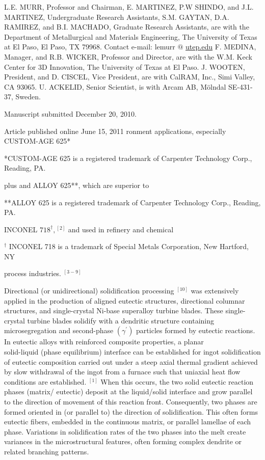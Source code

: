 \documentclass[10pt]{article}
\begin{document}
L.E. MURR, Professor and Chairman, E. MARTINEZ, P.W SHINDO, and J.L. MARTINEZ, Undergraduate Research Assistants, S.M. GAYTAN, D.A. RAMIREZ, and B.I. MACHADO, Graduate Research Assistants, are with the Department of Metallurgical and Materials Engineering, The University of Texas at El Paso, El Paso, TX 79968. Contact e-mail: lemurr $@$ \href{http://utep.edu}{utep.edu} F. MEDINA, Manager, and R.B. WICKER, Professor and Director, are with the W.M. Keck Center for 3D Innovation, The University of Texas at El Paso. J. WOOTEN, President, and D. CISCEL, Vice President, are with CalRAM, Inc., Simi Valley, CA 93065. U. ACKELID, Senior Scientist, is with Arcam AB, Mölndal SE-431-37, Sweden.

Manuscript submitted December 20, 2010.

Article published online June 15, 2011 ronment applications, especially CUSTOM-AGE 625*

*CUSTOM-AGE 625 is a registered trademark of Carpenter Technology Corp., Reading, PA.

plus and ALLOY 625**, which are superior to

**ALLOY 625 is a registered trademark of Carpenter Technology Corp., Reading, PA.

INCONEL $718^{\dagger},{ }^{[2]}$ and used in refinery and chemical

${ }^{\dagger}$ INCONEL 718 is a trademark of Special Metals Corporation, New Hartford, NY

process industries. ${ }^{[3-9]}$

Directional (or unidirectional) solidification processing $^{[10]}$ was extensively applied in the production of aligned eutectic structures, directional columnar structures, and single-crystal Ni-base superalloy turbine blades. These single-crystal turbine blades solidify with a dendritic structure containing microsegregation and second-phase $\left(\gamma^{\prime}\right)$ particles formed by eutectic reactions. In eutectic alloys with reinforced composite properties, a planar\\
solid-liquid (phase equilibrium) interface can be established for ingot solidification of eutectic composition carried out under a steep axial thermal gradient achieved by slow withdrawal of the ingot from a furnace such that uniaxial heat flow conditions are established. ${ }^{[1]}$ When this occurs, the two solid eutectic reaction phases (matrix/ eutectic) deposit at the liquid/solid interface and grow parallel to the direction of movement of this reaction front. Consequently, two phases are formed oriented in (or parallel to) the direction of solidification. This often forms eutectic fibers, embedded in the continuous matrix, or parallel lamellae of each phase. Variations in solidification rates of the two phases into the melt create variances in the microstructural features, often forming complex dendrite or related branching patterns.
\end{document}
